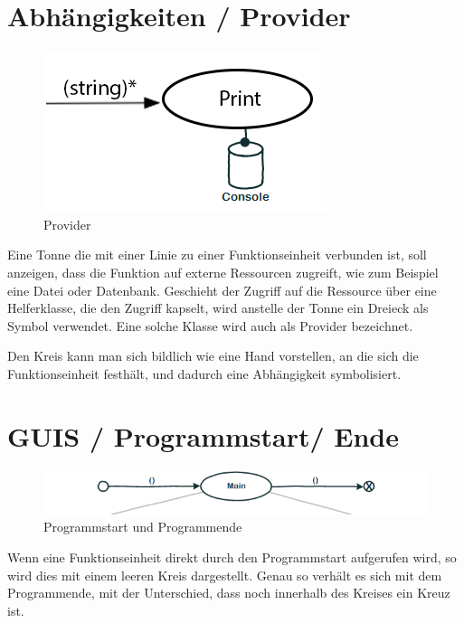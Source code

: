 \section{Abhängigkeiten / Provider}

\begin{figure}[H]
	\centering
		\includegraphics[width=.5\linewidth]{./img/diagramProvider.png}
	\caption{Provider}
\end{figure}



Eine Tonne die mit einer Linie zu einer Funktionseinheit verbunden ist, soll
anzeigen, dass die Funktion auf externe Ressourcen zugreift, wie zum
Beispiel eine Datei oder Datenbank. 
Geschieht der Zugriff auf die Ressource über eine Helferklasse, die den Zugriff
kapselt, wird anstelle der Tonne ein Dreieck als Symbol verwendet. Eine solche
Klasse wird auch als Provider bezeichnet. 

Den Kreis kann man sich bildlich wie eine Hand vorstellen, an die sich die
Funktionseinheit festhält, und dadurch eine Abhängigkeit symbolisiert.

\pagebreak

\section{GUIS / Programmstart/ Ende}

\begin{figure}[H]
	\centering
		\includegraphics[width=.9\linewidth]{./img/diagramStartEnd.png}
	\caption{Programmstart und Programmende}
\end{figure}




Wenn eine Funktionseinheit direkt durch den Programmstart aufgerufen wird, so
wird dies mit einem leeren Kreis dargestellt. Genau so verhält es sich mit dem
Programmende, mit der Unterschied, dass noch innerhalb des Kreises ein Kreuz ist.

